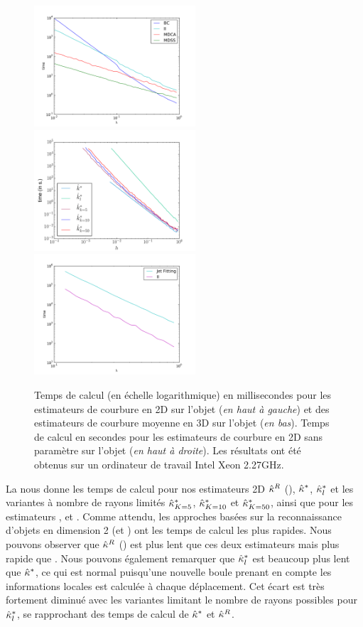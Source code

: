 \begin{figure}[ht]
  \begin{center}
    \includegraphics[width=6cm]{graphs/Timing2D}
    \includegraphics[width=6cm]{graphs/Timing2D_PF}\\
    \includegraphics[width=6cm]{graphs/Timing3D}
    \caption{
      Temps de calcul (en échelle logarithmique) en millisecondes pour les
      estimateurs de courbure en 2D sur l'objet \Flower (\emph{en haut à gauche})
      et des estimateurs de courbure moyenne en 3D sur l'objet \RoundedCube
      (\emph{en bas}). Temps de calcul en secondes pour les estimateurs de
      courbure en 2D sans paramètre sur l'objet \Ellipse (\emph{en haut à droite}).
      Les résultats ont été obtenus sur un ordinateur de travail Intel Xeon
      2.27GHz.
      }
      \label{fig:curv-experiments-timings}
  \end{center}
\end{figure}

La  nous donne les temps de calcul pour
nos estimateurs 2D $\hat{\kappa}^{R}$ (\II), $\hat{\kappa}^{*}$, $\hat{\kappa}^{*}_{l}$ et les variantes à
nombre de rayons limités $\hat{\kappa}^{*}_{K=5}$, $\hat{\kappa}^{*}_{K=10}$ et $\hat{\kappa}^{*}_{K=50}$,
ainsi que pour les estimateurs \BC, \MDSS et \MDCA. Comme attendu, les approches
basées sur la reconnaissance d'objets en dimension 2 (\MDSS et \MDCA) ont les
temps de calcul les plus rapides. Nous pouvons observer que $\hat{\kappa}^{R}$ (\II) est
plus lent que ces deux estimateurs mais plus rapide que \BC. Nous pouvons
également remarquer que $\hat{\kappa}^{*}_{l}$ est beaucoup plus lent que $\hat{\kappa}^{*}$, ce qui
est normal puisqu'une nouvelle boule prenant en compte les informations locales
est calculée à chaque déplacement. Cet écart est très fortement diminué avec les
variantes limitant le nombre de rayons possibles pour $\hat{\kappa}^{*}_{l}$, se rapprochant
des temps de calcul de $\hat{\kappa}^{*}$ et $\hat{\kappa}^{R}$.


